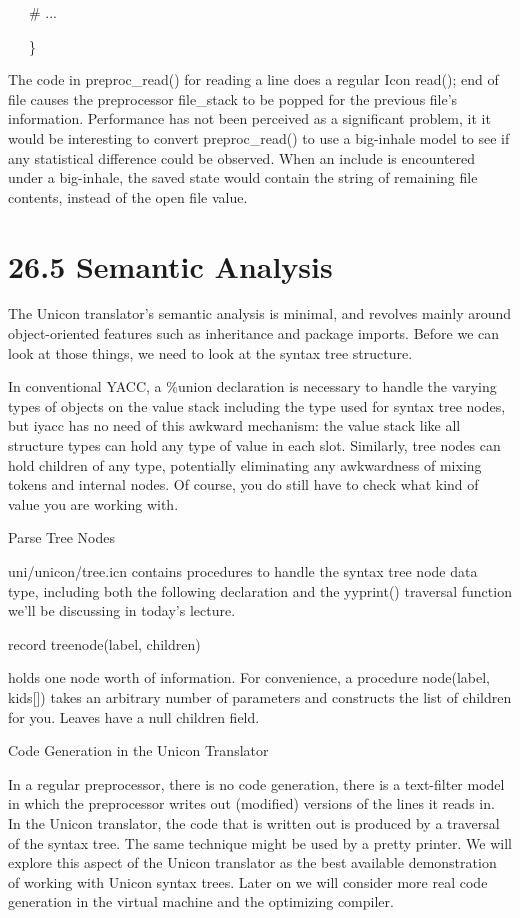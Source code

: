 {\ttfamily\mdseries
\ \ \ \# ...}

{\ttfamily\mdseries
\ \ \ \}}

The code in preproc\_read() for reading a line does a regular Icon
read(); end of file causes the preprocessor file\_stack to be popped
for the previous file's information. Performance has not been
perceived as a significant problem, it it would be interesting to
convert preproc\_read() to use a big-inhale model to see if any
statistical difference could be observed. When an include is
encountered under a big-inhale, the saved state would contain the
string of remaining file contents, instead of the open file value.


\section[26.5 Semantic Analysis]{26.5 Semantic Analysis}

The Unicon translator's semantic analysis is minimal, and revolves
mainly around object-oriented features such as inheritance and package
imports. Before we can look at those things, we need to look at the
syntax tree structure.

In conventional YACC, a \%union declaration is necessary to handle the
varying types of objects on the value stack including the type used
for syntax tree nodes, but iyacc has no need of this awkward
mechanism: the value stack like all structure types can hold any type
of value in each slot. Similarly, tree nodes can hold children of any
type, potentially eliminating any awkwardness of mixing tokens and
internal nodes. Of course, you do still have to check what kind of
value you are working with.

{\sffamily
Parse Tree Nodes }

uni/unicon/tree.icn contains procedures to handle the syntax tree node
data type, including both the following declaration and the yyprint()
traversal function we'll be discussing in today's lecture.

{\ttfamily\mdseries
record treenode(label, children)}

\noindent holds one node worth of information. For convenience, a
procedure node(label, kids[]) takes an arbitrary number of parameters
and constructs the list of children for you. Leaves have a null
children field.

{\sffamily
{\textquotedbl}Code Generation{\textquotedbl} in the Unicon Translator }

In a regular preprocessor, there is no code generation, there is a
text-filter model in which the preprocessor writes out (modified)
versions of the lines it reads in. In the Unicon translator, the code
that is written out is produced by a traversal of the syntax tree. The
same technique might be used by a {\textquotedbl}pretty
printer{\textquotedbl}. We will explore this aspect of the Unicon
translator as the best available demonstration of working with Unicon
syntax trees. Later on we will consider more
{\textquotedbl}real{\textquotedbl} code generation in the virtual
machine and the optimizing compiler.


